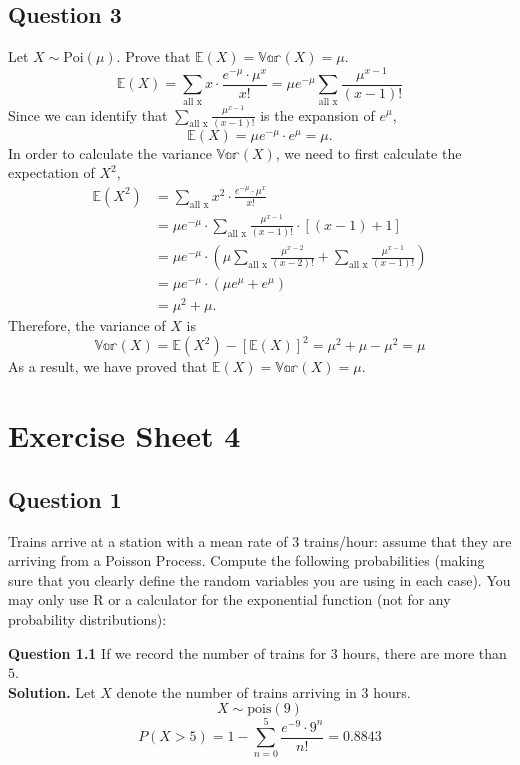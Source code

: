 \documentclass[
]{book}
\begin{document}
\section{Question 3}\label{question-3-1}

Let \(X \sim \text{Poi}(\mu)\). Prove that \(\mathbb{E}(X) = \mathbb{Var}(X) = \mu\).\\
\[\mathbb{E}(X) = \sum_{\text{all x}} x \cdot \frac{e^{-\mu} \cdot \mu^x}{x!} = \mu e^{-\mu} \sum_{\text{all x}} \frac{\mu^{x-1}}{(x-1)!}\] Since we can identify that \(\sum_{\text{all x}} \frac{\mu^{x-1}}{(x-1)!}\) is the expansion of \(e^{\mu}\),
\[\mathbb{E}(X) = \mu e^{-\mu} \cdot e^{\mu} = \mu.\]
In order to calculate the variance \(\mathbb{Var}(X)\), we need to first calculate the expectation of \(X^2\),
\[\begin{aligned}
\mathbb{E}(X^2) &= \sum_{\text{all x}} x^2 \cdot \frac{e^{-\mu} \cdot \mu^x}{x!} \\
&= \mu e^{-\mu}  \cdot \sum_{\text{all x}} \frac{\mu^{x-1}}{(x-1)!} \cdot [(x-1)+1] \\
&= \mu e^{-\mu} \cdot (\mu \sum_{\text{all x}} \frac{\mu^{x-2}}{(x-2)!} + \sum_{\text{all x}} \frac{\mu^{x-1}}{(x-1)!}) \\
&= \mu e^{-\mu} \cdot (\mu e^{\mu} + e^{\mu}) \\[0.5em]
&= \mu^2 + \mu.
\end{aligned}\]
Therefore, the variance of \(X\) is
\[\mathbb{Var}(X) = \mathbb{E}(X^2) - [\mathbb{E}(X)]^2 = \mu^2 + \mu - \mu^2 = \mu\]
As a result, we have proved that \(\mathbb{E}(X) = \mathbb{Var}(X) = \mu\).

\chapter{Exercise Sheet 4}\label{exercise-sheet-4}

\section{Question 1}\label{question-1-3}

Trains arrive at a station with a mean rate of \(3\) trains/hour: assume that they are arriving from a Poisson Process. Compute the following probabilities (making sure that you clearly define the random variables you are using in each case). You may only use R or a calculator for the exponential function (not for any probability distributions):

\textbf{Question 1.1} If we record the number of trains for \(3\) hours, there are more than \(5\).\\
\textbf{Solution.} Let \(X\) denote the number of trains arriving in \(3\) hours.
\[X \sim \text{pois}(9)\]
\[P(X > 5) = 1 - \sum_{n = 0}^{5} \frac{e^{-9} \cdot 9^n}{n!} = 0.8843\]
\end{document}
